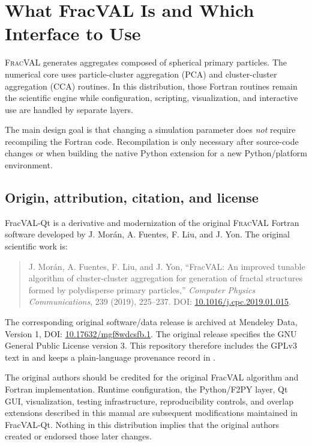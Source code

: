 \documentclass[11pt,oneside]{report}
\newcommand{\FracVAL}{\textsc{FracVAL}}
\begin{document}
\tableofcontents
\clearpage
{}
\hypersetup{pageanchor=true}

\chapter{What FracVAL Is and Which Interface to Use}

\FracVAL{} generates aggregates composed of spherical primary particles. The
numerical core uses particle-cluster aggregation (PCA) and cluster-cluster
aggregation (CCA) routines. In this distribution, those Fortran routines remain
the scientific engine while configuration, scripting, visualization, and
interactive use are handled by separate layers.

The main design goal is that changing a simulation parameter does \emph{not}
require recompiling the Fortran code. Recompilation is only necessary after
source-code changes or when building the native Python extension for a new
Python/platform environment.

\section{Origin, attribution, citation, and license}

FracVAL-Qt is a derivative and modernization of the original \FracVAL{}
Fortran software developed by J. Morán, A. Fuentes, F. Liu, and J. Yon. The
original scientific work is:

\begin{quote}
J. Morán, A. Fuentes, F. Liu, and J. Yon, ``FracVAL: An improved tunable
algorithm of cluster-cluster aggregation for generation of fractal structures
formed by polydisperse primary particles,'' \emph{Computer Physics
Communications}, 239 (2019), 225--237. DOI:
\href{https://doi.org/10.1016/j.cpc.2019.01.015}{10.1016/j.cpc.2019.01.015}.
\end{quote}

The corresponding original software/data release is archived at Mendeley Data,
Version 1, DOI:
\href{https://doi.org/10.17632/mgf8wdcsfb.1}{10.17632/mgf8wdcsfb.1}.
The original release specifies the GNU General Public License version 3. This
repository therefore includes the GPLv3 text in  and keeps a
plain-language provenance record in .

The original authors should be credited for the original FracVAL algorithm and
Fortran implementation. Runtime configuration, the Python/F2PY layer, Qt GUI,
visualization, testing infrastructure, reproducibility controls, and overlap
extensions described in this manual are subsequent modifications maintained in
FracVAL-Qt. Nothing in this distribution implies that the original authors
created or endorsed those later changes.
\end{document}
